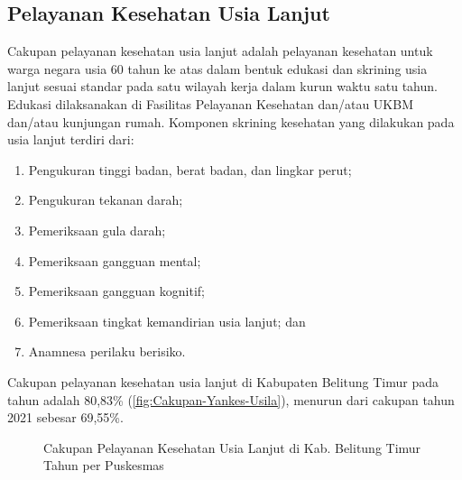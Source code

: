 \subsection{Pelayanan Kesehatan Usia Lanjut}
Cakupan pelayanan kesehatan usia lanjut adalah pelayanan kesehatan untuk warga negara usia 60 tahun ke atas dalam bentuk edukasi dan skrining usia
lanjut sesuai standar pada satu wilayah kerja dalam kurun waktu satu tahun. Edukasi dilaksanakan di Fasilitas Pelayanan Kesehatan dan/atau UKBM dan/atau kunjungan rumah. Komponen skrining kesehatan yang dilakukan pada usia lanjut terdiri dari:
\begin{enumerate}
  \item Pengukuran tinggi badan, berat badan, dan lingkar perut;
  \item Pengukuran tekanan darah;
  \item Pemeriksaan gula darah;
  \item Pemeriksaan gangguan mental;
  \item Pemeriksaan gangguan kognitif;
  \item Pemeriksaan tingkat kemandirian usia lanjut; dan
  \item Anamnesa perilaku berisiko.
\end{enumerate}

Cakupan pelayanan kesehatan usia lanjut di Kabupaten Belitung Timur pada tahun \tP adalah 80,83\% (\autoref{fig:Cakupan-Yankes-Usila}), menurun dari cakupan tahun 2021 sebesar 69,55\%.

\begin{figure}[H]
    \centering
    \caption{Cakupan Pelayanan Kesehatan Usia Lanjut di Kab. Belitung
Timur Tahun \tP per Puskesmas}
    \label{fig:Cakupan-Yankes-Usila}
\end{figure}
